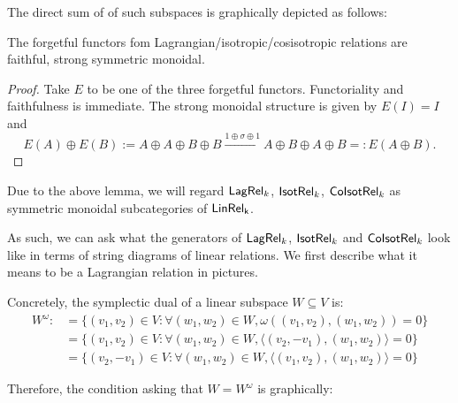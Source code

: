 
The direct sum of of such subspaces is graphically depicted as follows:


\begin{lemma}
\label{lemma:strong}
The forgetful functors fom Lagrangian/isotropic/cosisotropic relations  are faithful, strong symmetric monoidal.
\end{lemma}

\begin{proof}
Take $E$ to be one of the three forgetful functors.
  Functoriality and faithfulness is immediate. The strong monoidal structure is given by $E(I) = I$ and
  \[ E(A) \oplus E(B) := A \oplus A \oplus B \oplus B \xrightarrow{1 \oplus \sigma \oplus 1} A \oplus B \oplus A \oplus B =: E(A \oplus B). \]
\end{proof}


Due to the above lemma, we will regard $\mathsf{Lag}\mathsf{Rel}_k$, ${\sf Isot}\mathsf{Rel}_k$, ${\sf Co}{\sf Isot}\mathsf{Rel}_k$ as symmetric monoidal subcategories of $\sf LinRel_k$.

As such, we can ask what the generators of $\mathsf{Lag}\mathsf{Rel}_k$, ${\sf Isot}\mathsf{Rel}_k$ and ${\sf Co}{\sf Isot}\mathsf{Rel}_k$ look like in terms of string diagrams of linear relations. We first describe what it means to be a Lagrangian relation in pictures.

Concretely, the symplectic dual of a linear subspace $W \subseteq V$ is:
\begin{align*}
W^\omega :&= \{(v_1,v_2) \in V : \forall (w_1,w_2) \in W, \omega((v_1,v_2),(w_1,w_2))=0 \}\\
                    &= \{(v_1,v_2) \in V : \forall (w_1,w_2) \in W,  \langle (v_2,-v_1) ,(w_1,w_2)\rangle =0 \}\\
                    &= \{(v_2,-v_1) \in V : \forall (w_1,w_2) \in W,  \langle (v_1,v_2) ,(w_1,w_2)\rangle =0 \}
\end{align*}

Therefore, the condition asking that $W=W^\omega$ is graphically:

